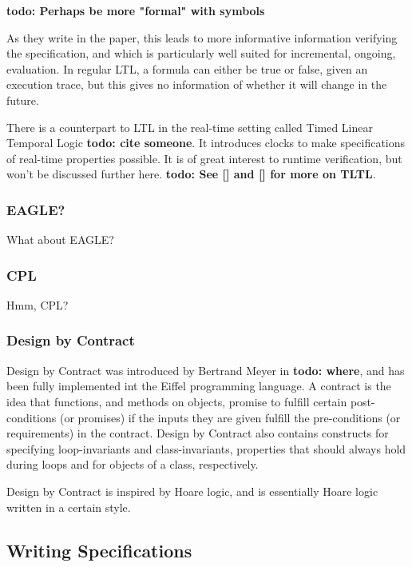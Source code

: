 \documentclass[a4paper,11pt]{kth-mag}
\newcommand{\todo}[1]{\textbf{todo: #1}}
\begin{document}
\todo{Perhaps be more "formal" with symbols}

As they write in the paper, this leads to more informative information verifying the specification,
and which is particularly well suited for incremental, ongoing, evaluation. In regular LTL, a formula
can either be true or false, given an execution trace, but this gives no information of whether it
will change in the future.

There is a counterpart to LTL in the real-time setting called Timed Linear Temporal Logic \todo{cite someone}. It introduces clocks to make specifications of real-time properties possible. It is
of great interest to runtime verification, but won't be discussed further here. \todo{See [] and [] for more on TLTL}.

\subsubsection{EAGLE?}

What about EAGLE?

\subsubsection{CPL}

Hmm, CPL?



\subsubsection{Design by Contract}

Design by Contract was introduced by Bertrand Meyer in \todo{where}, and has been fully implemented
int the Eiffel programming language. A contract is the idea that functions, and methods on objects,
promise to fulfill certain post-conditions (or promises) if the inputs they are given fulfill the pre-conditions (or requirements) in the contract. Design by Contract also contains constructs for
specifying loop-invariants and class-invariants, properties that should always hold during loops and for objects of a class, respectively.

Design by Contract is inspired by Hoare logic, and is essentially Hoare logic written in a certain style.

\subsection{Writing Specifications}
\end{document}
